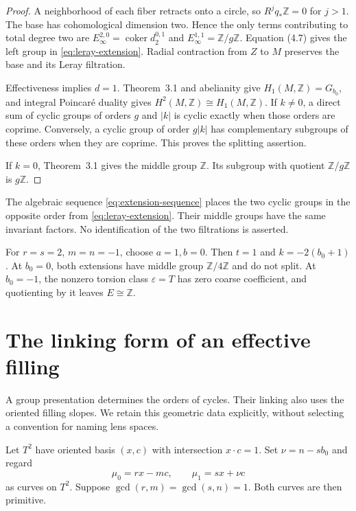 \documentclass[11pt]{article}
\numberwithin{equation}{section}
\begin{document}
\begin{proof}
A neighborhood of each fiber retracts onto a circle, so
$R^jq_*\mathbb Z=0$ for $j>1$.  The base has cohomological dimension
two.  Hence the only terms contributing to total degree two are
$E_\infty^{2,0}=\operatorname{coker}d_2^{0,1}$ and
$E_\infty^{1,1}=\mathbb Z/g\mathbb Z$.  Equation (4.7) gives the
left group in \eqref{eq:leray-extension}.  Radial contraction from $Z$
to $M$ preserves the base and its Leray filtration.

Effectiveness implies $d=1$.  Theorem~3.1 and abelianity give
$H_1(M,\mathbb Z)=G_{b_0}$, and integral Poincar\'e duality gives
$H^2(M,\mathbb Z)\cong H_1(M,\mathbb Z)$.
If $k\ne0$, a direct sum of cyclic groups of orders $g$ and $|k|$ is
cyclic exactly when those orders are coprime.  Conversely, a cyclic group
of order $g|k|$ has complementary subgroups of these orders when they
are coprime.  This proves the splitting assertion.

If $k=0$, Theorem~3.1 gives the middle group $\mathbb Z$.
Its subgroup with quotient $\mathbb Z/g\mathbb Z$ is $g\mathbb Z$.
\end{proof}

The algebraic sequence \eqref{eq:extension-sequence} places the two
cyclic groups in the opposite order from \eqref{eq:leray-extension}.
Their middle groups have the same invariant factors.  No identification
of the two filtrations is asserted.

For $r=s=2$, $m=n=-1$, choose $a=1,b=0$.  Then $t=1$ and
$k=-2(b_0+1)$.  At $b_0=0$, both extensions have middle group
$\mathbb Z/4\mathbb Z$ and do not split.
At $b_0=-1$, the nonzero torsion class $\varepsilon=T$ has zero
coarse coefficient, and quotienting by it leaves $E\cong\mathbb Z$.

\section{The linking form of an effective filling}

A group presentation determines the orders of cycles.  Their linking
also uses the oriented filling slopes.  We retain this geometric data
explicitly, without selecting a convention for naming lens spaces.

Let $T^2$ have oriented basis $(x,c)$ with intersection $x\cdot c=1$.
Set $\nu=n-sb_0$ and regard
\begin{equation}\label{eq:filling-slopes}
       \mu_0=rx-mc,\qquad \mu_1=sx+\nu c
\end{equation}
as curves on $T^2$.  Suppose
$\gcd(r,m)=\gcd(s,n)=1$.  Both curves are then primitive.
\end{document}
